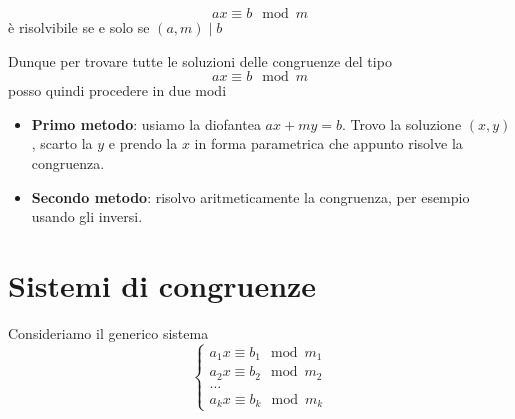 \begin{theorem}
	\begin{equation*}
		ax \equiv b \mod{m}
	\end{equation*}
	\`e risolvibile se e solo se $(a, m) \mid b$
\end{theorem}

Dunque per trovare tutte le soluzioni delle congruenze del tipo
\begin{equation*}
	ax \equiv b \mod{m}
\end{equation*}
posso quindi procedere in due modi
\begin{itemize}
	\item \textbf{Primo metodo}: usiamo la diofantea $ax + my = b$. Trovo la soluzione $(x, y)$,
	      scarto la $y$ e prendo la $x$ in forma parametrica che appunto risolve la congruenza.
	\item \textbf{Secondo metodo}: risolvo aritmeticamente la congruenza, per esempio usando gli
	      inversi.
\end{itemize}

\section{Sistemi di congruenze}
Consideriamo il generico sistema
\begin{equation*}
	\begin{cases}
		a_1 x \equiv b_1 \mod{m_1} \\
		a_2 x \equiv b_2 \mod{m_2} \\
		\dots                      \\
		a_k x \equiv b_k \mod{m_k}
	\end{cases}
\end{equation*}

